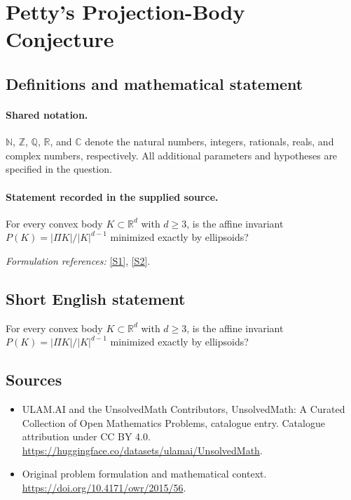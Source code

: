 \documentclass[11pt]{article}
\newcommand{\sref}[2]{\hyperlink{source:#1:#2}{[S#2]}}
\begin{document}
\section{Petty’s Projection-Body Conjecture}\label{statement}

\subsection{Definitions and mathematical statement}

\paragraph{Shared notation.}$\mathbb N$, $\mathbb Z$, $\mathbb Q$, $\mathbb R$, and $\mathbb C$ denote the natural numbers, integers, rationals, reals, and complex numbers, respectively. All additional parameters and hypotheses are specified in the question.


\paragraph{Statement recorded in the supplied source.}
For every convex body $K\subset\mathbb{R}^d$ with $d\geq3$, is the affine invariant $P(K)=|\Pi K|/|K|^{d-1}$ minimized exactly by ellipsoids?
\par\smallskip\textit{Formulation references:} \sref{statement}{1}, \sref{statement}{2}.
\subsection{Short English statement}
For every convex body $K\subset\mathbb{R}^d$ with $d\geq3$, is the affine invariant $P(K)=|\Pi K|/|K|^{d-1}$ minimized exactly by ellipsoids?
\subsection{Sources}
\begin{itemize}
\item[\hypertarget{source:statement:1}{S1}] ULAM.AI and the UnsolvedMath Contributors, UnsolvedMath: A Curated Collection of Open Mathematics Problems, catalogue entry. Catalogue attribution under CC BY 4.0.
\url{https://huggingface.co/datasets/ulamai/UnsolvedMath}.
\item[\hypertarget{source:statement:2}{S2}] Original problem formulation and mathematical context.
\url{https://doi.org/10.4171/owr/2015/56}.
\end{itemize}
\label{end:statement}
\end{document}
